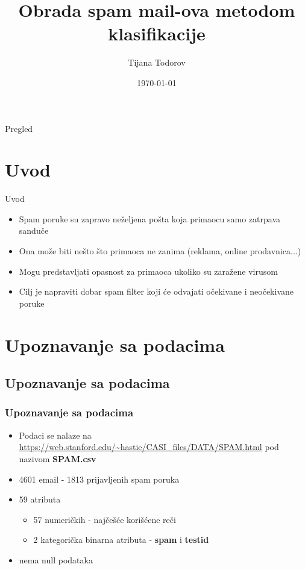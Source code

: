\documentclass{beamer}
\title{Obrada spam mail-ova metodom klasifikacije }
\author{Tijana Todorov}
\date{\today}
\begin{document}
\begin{frame}
  \titlepage
\end{frame}

\begin{frame}{Pregled}
  \tableofcontents
\end{frame}

\section{Uvod}
\begin{frame}{Uvod}
\begin{itemize}
 \item Spam poruke su zapravo neželjena pošta koja primaocu samo zatrpava sanduče 
 \item Ona može biti nešto što primaoca ne zanima (reklama, online prodavnica...)
 \item Mogu predstavljati opasnost za primaoca ukoliko su zaražene virusom
 \item Cilj je napraviti dobar spam filter koji će odvajati očekivane i neočekivane poruke
\end{itemize}
\end{frame}

\section{Upoznavanje sa podacima}
\subsection*{Upoznavanje sa podacima}
\begin{frame}[fragile]
\frametitle{Upoznavanje sa podacima}
\begin{itemize}
 \item Podaci se nalaze na  \url{https://web.stanford.edu/~hastie/CASI_files/DATA/SPAM.html} pod nazivom \textbf{SPAM.csv}
 \item 4601 email - 1813 prijavljenih spam poruka
 \item 59 atributa
 	\begin{itemize}
 	\item 57 numeričkih - najčešće korišćene reči 
 	\item 2 kategorička binarna atributa - \textbf{spam} i \textbf{testid}  	
 	\end{itemize}
 \item nema null podataka
\end{itemize}
\end{frame}
\end{document}
